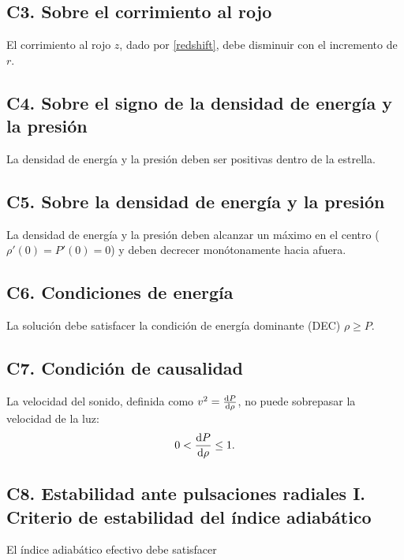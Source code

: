 \subsection*{C3. Sobre el corrimiento al rojo}
\noindent El corrimiento al rojo $z$, dado por \eqref{redshift}, debe disminuir con el incremento de $r$.

\subsection*{C4. Sobre el signo de la densidad de energía y la presión}
\noindent La densidad de energía y la presión deben ser positivas dentro de la estrella.

\subsection*{C5. Sobre la densidad de energía y la presión}
\noindent La densidad de energía y la presión deben alcanzar un máximo en el centro ($\rho'(0)=P'(0)=0$) y deben decrecer monótonamente hacia afuera.

\subsection*{C6. Condiciones de energía}
\noindent La solución debe satisfacer la condición de energía dominante (DEC) $\rho \geq P$.
\subsection*{C7. Condición de causalidad}
La velocidad del sonido, definida como $v^2=\dv{P}{\rho}$, no puede sobrepasar la velocidad de la luz:
\begin{equation}
    0 < \dv{P}{\rho} \leq 1 .
\end{equation}

\subsection*{C8. Estabilidad ante pulsaciones radiales I. \noindent Criterio de estabilidad del índice adiabático } 
\noindent El índice adiabático efectivo debe satisfacer \cite{Merafina1989}

